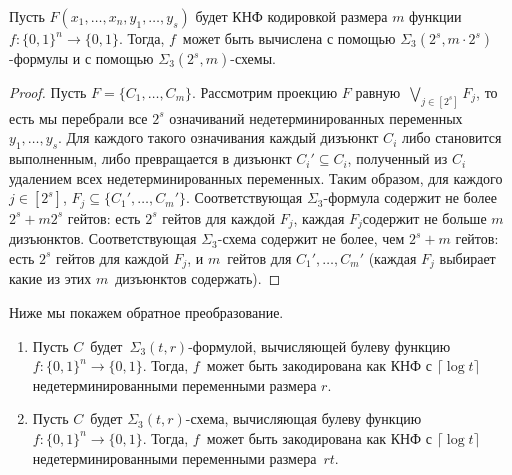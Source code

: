 \begin{lemma}
	Пусть $F(x_1, \dotsc, x_n, y_1, \dotsc, y_s)$ будет КНФ кодировкой размера $m$
	функции
	$f \colon \{0,1\}^n \to \{0,1\}$.
	Тогда, $f$~может быть вычислена с помощью
	$\Sigma_3(2^s, m \cdot 2^s)$-формулы и с помощью $\Sigma_3(2^s,m)$-схемы.
\end{lemma}
\begin{proof}
	Пусть $F=\{C_1, \dotsc, C_m\}$. Рассмотрим проекцию $F$ равную~$\bigvee_{j \in [2^s]}F_j$,
	то есть мы перебрали все $2^s$ означиваний недетерминированных переменных
	$y_1, \dotsc, y_s$. 
	Для каждого такого означивания каждый дизъюнкт $C_i$ либо становится выполненным, 
	либо превращается в дизъюнкт $C_i' \subseteq C_i$, полученный из $C_i$ 
	удалением всех недетерминированных переменных.
	Таким образом, для каждого $j \in [2^s]$, $F_j \subseteq \{C_1', \dotsc, C_m'\}$.
	Соответствующая $\Sigma_3$-формула содержит не более $2^s+m2^s$ гейтов:
	есть $2^s$ гейтов для каждой $F_j$, каждая $F_j$содержит не больше $m$ дизъюнктов.
	Соответствующая $\Sigma_3$-схема содержит не более, чем $2^s+m$ гейтов:
	есть $2^s$ гейтов для каждой $F_j$, и $m$~гейтов для $C_1', \dotsc, C_m'$
	(каждая $F_j$ выбирает какие из этих $m$~дизъюнктов содержать).
\end{proof}

Ниже мы покажем обратное преобразование.

\begin{lemma}\label{lemma:circuit2encoding}
	\begin{enumerate}
		\item Пусть $C$~будет~$\Sigma_3(t,r)$-формулой, вычисляющей булеву функцию $f \colon \{0,1\}^n \to \{0,1\}$. 
		Тогда,
		$f$~может быть закодирована как КНФ с $\lceil \log t \rceil$ недетерминированными переменными размера $r$.
		\item Пусть $C$~будет $\Sigma_3(t,r)$-схема, вычисляющая булеву функцию $f \colon \{0,1\}^n \to \{0,1\}$. Тогда,
		$f$~может быть закодирована как КНФ с $\lceil \log t \rceil$ недетерминированными переменными размера~$rt$.
	\end{enumerate}
\end{lemma}

